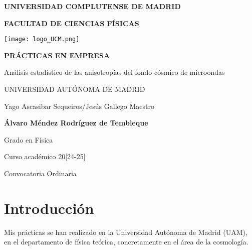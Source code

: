 \documentclass[12pt, a4paper]{article}
\theoremstyle{definition}
\begin{document}
\begin{titlepage}
  \centering
  { \bfseries \Large UNIVERSIDAD COMPLUTENSE DE MADRID}
  \vspace{0.5cm}

  {\bfseries  \Large FACULTAD DE CIENCIAS FÍSICAS}
  \vspace{1cm}


  {\texttt{[image: logo\_UCM.png]}} %
  \vspace{0.8cm}

  {\bfseries \Large PRÁCTICAS EN EMPRESA}
  \vspace{2cm}


  {\Large Análisis estadístico de las anisotropías del fondo cósmico de microondas }\vspace{5mm}

  {\Large UNIVERSIDAD AUTÓNOMA DE MADRID}\vspace{5mm}

  {\Large Yago Ascasibar Sequeiros/Jesús Gallego Maestro}\vspace{10mm}

  {\bfseries \LARGE Álvaro Méndez Rodríguez de Tembleque}\vspace{5mm}

  {\large Grado en Física}\vspace{5mm}

  {\large Curso acad\'emico 20[24-25]}\vspace{5mm}

  {\large Convocatoria Ordinaria}\vspace{5mm}

\end{titlepage}

\newpage

\tableofcontents
\section{Introducción}

Mis prácticas se han realizado en la Universidad Autónoma de Madrid (UAM), en el departamento de física teórica, concretamente en el área de la cosmología.
\end{document}
